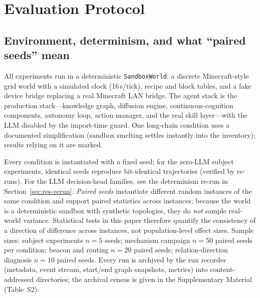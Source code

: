 \documentclass[10pt,a4paper]{article}
\begin{document}
\section{Evaluation Protocol}
\label{sec:method}

\subsection{Environment, determinism, and what ``paired seeds'' mean}
\label{sec:method-env}
All experiments run in a deterministic \texttt{SandboxWorld}: a discrete Minecraft-style grid world with a simulated clock (16\,s/tick), recipe and block tables, and a fake device bridge replacing a real Minecraft LAN bridge. The agent stack is the production stack---knowledge graph, diffusion engine, continuous-cognition components, autonomy loop, action manager, and the real skill layer---with the LLM disabled by the import-time guard. One long-chain condition uses a documented simplification (sandbox smelting settles instantly into the inventory); results relying on it are marked.

Every condition is instantiated with a fixed seed; for the zero-LLM subject experiments, identical seeds reproduce bit-identical trajectories (verified by re-runs). For the LLM decision-head families, see the determinism re-run in Section~\ref{sec:res-rerun}. \emph{Paired seeds} instantiate different random instances of the same condition and support paired statistics across instances; because the world is a deterministic sandbox with synthetic topologies, they do \emph{not} sample real-world variance. Statistical tests in this paper therefore quantify the consistency of a direction of difference across instances, not population-level effect sizes. Sample sizes: subject experiments $n{=}5$ seeds; mechanism campaign $n{=}50$ paired seeds per condition; beacon and routing $n{=}20$ paired seeds; relation-direction diagnosis $n{=}10$ paired seeds. Every run is archived by the run recorder (metadata, event stream, start/end graph snapshots, metrics) into content-addressed directories; the archival census is given in the Supplementary Material (Table~S2).
\end{document}
